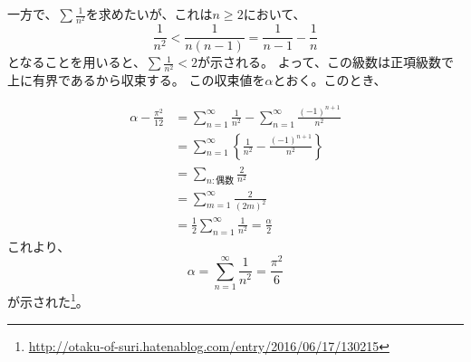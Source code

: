 \documentclass{jsarticle}
\begin{document}
一方で、$\sum\frac{1}{n^2}$を求めたいが、これは$n\geq 2$において、
\begin{equation}
	\frac{1}{n^{2}}<\frac{1}{n(n-1)}=\frac{1}{n-1}-\frac{1}{n}
\end{equation}
となることを用いると、$\sum\frac{1}{n^2}<2$が示される。
よって、この級数は正項級数で上に有界であるから収束する。
この収束値を$\alpha$とおく。このとき、

\begin{align}
	\alpha-\frac{\pi^{2}}{12}
	&=\sum_{n=1}^{\infty}\frac{1}{n^2}-\sum_{n=1}^{\infty}\frac{(-1)^{n+1}}{n^{2}}\\
	&=\sum_{n=1}^{\infty}\left\{\frac{1}{n^{2}}-\frac{(-1)^{n+1}}{n^{2}}\right\}\\
	&=\sum_{n:偶数}\frac{2}{n^{2}}\\
	&=\sum_{m=1}^{\infty}\frac{2}{(2m)^{2}}\\
	&=\frac{1}{2}\sum_{n=1}^{\infty}\frac{1}{n^{2}}=\frac{\alpha}{2}
\end{align}
これより、
\begin{equation}
	\alpha=\sum_{n=1}^{\infty}\frac{1}{n^{2}}=\frac{\pi^{2}}{6}
\end{equation}
が示された\footnote{\url{http://otaku-of-suri.hatenablog.com/entry/2016/06/17/130215}}。
\end{document}
